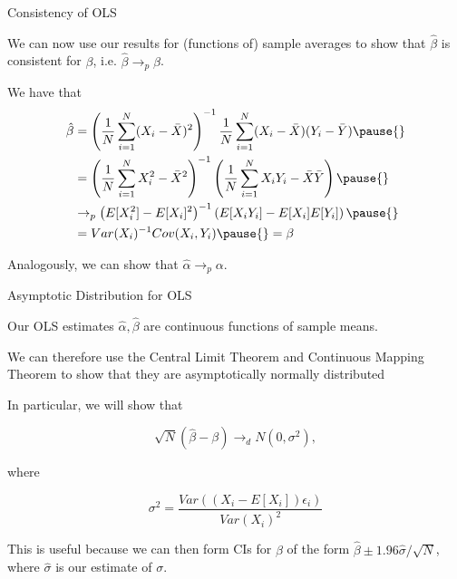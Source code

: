 \documentclass[11pt,english,handout]{beamer}
\newenvironment{wideitemize}{\itemize\addtolength{\itemsep}{10pt}}{\enditemize}
\begin{document}
%

\begin{frame}{Consistency of OLS}
\begin{wideitemize}
\item
We can now use our results for (functions of) sample averages to show that $\hat\beta$ is consistent for $\beta$, i.e. $\hat\beta \rightarrow_p \beta$.

\pause
\item
We have that
\begin{align*}
 \hat\beta &=\left( \frac{1}{N} \sum_{i=1}^N (X_i - \bar{X})^2 \right)^{-1}   \frac{1}{N} \sum_{i=1}^{N} (X_i - \bar{X})(Y_i - \bar{Y}) \pause{}  \\
 &= \left( \frac{1}{N} \sum_{i=1}^N X_i^2 - \bar{X}^2 \right)^{-1}   \left( \frac{1}{N} \sum_{i=1}^{N} X_i Y_i - \bar{X} \bar{Y} \right) \pause{} \\
 & \rightarrow_p \left( E[X_i^2] - E[X_i]^2 \right)^{-1}   \left( E[X_i Y_i] - E[X_i] E[Y_i] \right) \pause{} \\
 &= Var(X_i)^{-1} Cov(X_i, Y_i) \pause{} = \beta
\end{align*}


\pause
\item
Analogously, we can show that $\hat\alpha \rightarrow_p \alpha$.
\end{wideitemize}		
\end{frame}


\begin{frame}{Asymptotic Distribution for OLS}
	\begin{wideitemize}
	\item
	Our OLS estimates $\hat\alpha, \hat\beta$ are continuous functions of sample means.
	
	\pause
	\item
	We can therefore use the Central Limit Theorem and Continuous Mapping Theorem to show that they are asymptotically normally distributed
	
	\pause
	\item
	In particular, we will show that
	
		$$\sqrt{N}(\hat\beta - \beta) \rightarrow_d N(0, \sigma^2),$$
	
	\noindent where
	
	$$\sigma^2 = \dfrac{  Var((X_i - E[X_i])\epsilon_i) }{ Var(X_i)^2  }$$ 
	
	
	\pause
	\item
	This is useful because we can then form CIs for $\beta$ of the form $\hat\beta 	\pm 1.96 \hat\sigma / \sqrt{N}$, where $\hat\sigma$ is our estimate of $\sigma$. 
	
	\end{wideitemize}	
\end{frame}
\end{document}
